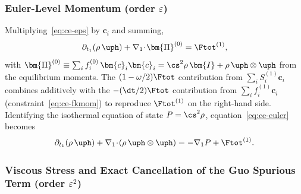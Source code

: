 \subsubsection{Euler-Level Momentum (order $\varepsilon$)}\label{sec:ce-euler}

Multiplying~\eqref{eq:ce-eps} by $\bm{c}_i$ and summing,
\begin{equation}
\partial_{t_1}(\rho\,\uph) + \nabla_1\!\cdot\!\bm{\Pi}^{(0)} = \Ftot^{(1)},
\label{eq:ce-euler}
\end{equation}
with $\bm{\Pi}^{(0)} \equiv \sum_i f_i^{(0)}\,\bm{c}_i\bm{c}_i = \cs^{2}\rho\,\bm{I} + \rho\,\uph\otimes\uph$ from the equilibrium moments.
The $(1-\omega/2)\Ftot$ contribution from $\sum_i S_i^{(1)}\bm{c}_i$ combines additively with the $-(\dt/2)\Ftot$ contribution from $\sum_i f_i^{(1)}\bm{c}_i$ (constraint~\eqref{eq:ce-fkmom}) to reproduce $\Ftot^{(1)}$ on the right-hand side.
Identifying the isothermal equation of state $P = \cs^{2}\rho$, equation~\eqref{eq:ce-euler} becomes
\begin{equation}
\partial_{t_1}(\rho\,\uph) + \nabla_1\!\cdot\!(\rho\,\uph\otimes\uph) = -\nabla_1 P + \Ftot^{(1)}.
\label{eq:ce-euler2}
\end{equation}

\subsubsection{Viscous Stress and Exact Cancellation of the Guo Spurious Term (order $\varepsilon^{2}$)}\label{sec:ce-viscous}

